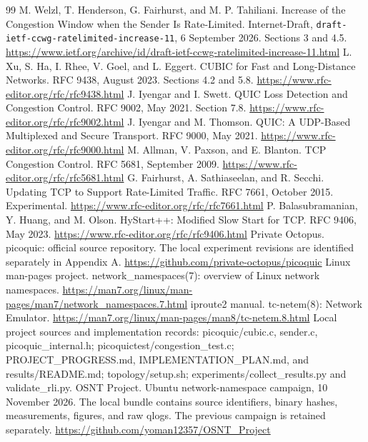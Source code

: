 \clearpage
{}\label{sec:references}
\begingroup\small
\begin{thebibliography}{99}
 M. Welzl, T. Henderson, G. Fairhurst, and M. P. Tahiliani. Increase of the Congestion Window when the Sender Is Rate-Limited. Internet-Draft, \nolinkurl{draft-ietf-ccwg-ratelimited-increase-11}, 6 September 2026. Sections 3 and 4.5. \url{https://www.ietf.org/archive/id/draft-ietf-ccwg-ratelimited-increase-11.html}
 L. Xu, S. Ha, I. Rhee, V. Goel, and L. Eggert. CUBIC for Fast and Long-Distance Networks. RFC 9438, August 2023. Sections 4.2 and 5.8. \url{https://www.rfc-editor.org/rfc/rfc9438.html}
 J. Iyengar and I. Swett. QUIC Loss Detection and Congestion Control. RFC 9002, May 2021. Section 7.8. \url{https://www.rfc-editor.org/rfc/rfc9002.html}
 J. Iyengar and M. Thomson. QUIC: A UDP-Based Multiplexed and Secure Transport. RFC 9000, May 2021. \url{https://www.rfc-editor.org/rfc/rfc9000.html}
 M. Allman, V. Paxson, and E. Blanton. TCP Congestion Control. RFC 5681, September 2009. \url{https://www.rfc-editor.org/rfc/rfc5681.html}
 G. Fairhurst, A. Sathiaseelan, and R. Secchi. Updating TCP to Support Rate-Limited Traffic. RFC 7661, October 2015. Experimental. \url{https://www.rfc-editor.org/rfc/rfc7661.html}
 P. Balasubramanian, Y. Huang, and M. Olson. HyStart++: Modified Slow Start for TCP. RFC 9406, May 2023. \url{https://www.rfc-editor.org/rfc/rfc9406.html}
 Private Octopus. picoquic: official source repository. The local experiment revisions are identified separately in Appendix A. \url{https://github.com/private-octopus/picoquic}
 Linux man-pages project. network\_namespaces(7): overview of Linux network namespaces. \url{https://man7.org/linux/man-pages/man7/network_namespaces.7.html}
 iproute2 manual. tc-netem(8): Network Emulator. \url{https://man7.org/linux/man-pages/man8/tc-netem.8.html}
 Local project sources and implementation records: picoquic/cubic.c, sender.c, picoquic\_internal.h; picoquictest/congestion\_test.c; PROJECT\_PROGRESS.md, IMPLEMENTATION\_PLAN.md, and results/README.md; topology/setup.sh; experiments/collect\_results.py and validate\_rli.py.
 OSNT Project. Ubuntu network-namespace campaign, 10 November 2026. The local  bundle contains source identifiers, binary hashes, measurements, figures, and raw qlogs. The previous campaign is retained separately. \url{https://github.com/yoman12357/OSNT_Project}
\end{thebibliography}
\endgroup

